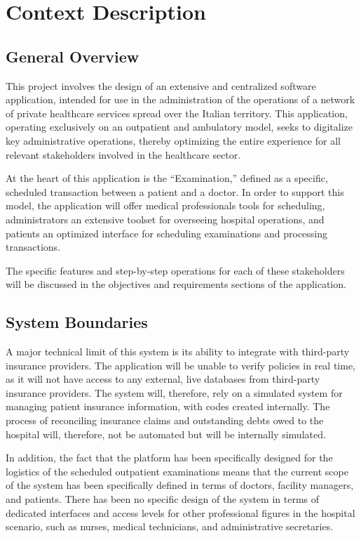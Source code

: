 \documentclass[12pt, a4paper]{article}
\begin{document}
\vspace{3em}





\section{Context Description}

\subsection{General Overview}
This project involves the design of an extensive and centralized software application, intended for use in the administration of the operations of a network of private healthcare services spread over the Italian territory. This application, operating exclusively on an outpatient and ambulatory model, seeks to digitalize key administrative operations, thereby optimizing the entire experience for all relevant stakeholders involved in the healthcare sector.

At the heart of this application is the ``Examination,'' defined as a specific, scheduled transaction between a patient and a doctor. In order to support this model, the application will offer medical professionals tools for scheduling, administrators an extensive toolset for overseeing hospital operations, and patients an optimized interface for scheduling examinations and processing transactions.

The specific features and step-by-step operations for each of these stakeholders will be discussed in the objectives and requirements sections of the application.

\subsection{System Boundaries}
A major technical limit of this system is its ability to integrate with third-party insurance providers. The application will be unable to verify policies in real time, as it will not have access to any external, live databases from third-party insurance providers. The system will, therefore, rely on a simulated system for managing patient insurance information, with codes created internally. The process of reconciling insurance claims and outstanding debts owed to the hospital will, therefore, not be automated but will be internally simulated.

In addition, the fact that the platform has been specifically designed for the logistics of the scheduled outpatient examinations means that the current scope of the system has been specifically defined in terms of doctors, facility managers, and patients. There has been no specific design of the system in terms of dedicated interfaces and access levels for other professional figures in the hospital scenario, such as nurses, medical technicians, and administrative secretaries.
      
\end{document}
